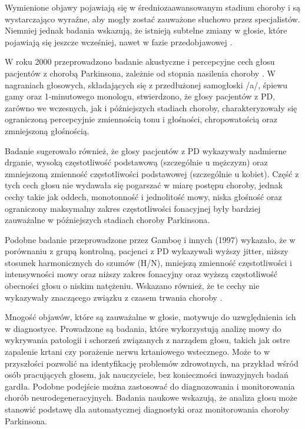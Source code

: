 Wymienione objawy pojawiają się w średniozaawansowanym stadium choroby i są wystarczająco wyraźne, aby mogły zostać zauważone słuchowo przez specjalistów.
Niemniej jednak badania wskazują, że istnieją subtelne zmiany w głosie, które pojawiają się jeszcze wcześniej, nawet w fazie przedobjawowej \cite{2023_PD_voice}.

W roku 2000 przeprowadzono badanie akustyczne i percepcyjne cech głosu pacjentów z chorobą Parkinsona, zależnie od stopnia nasilenia choroby \cite{https://doi.org/10.1080/136828200410654}.
W nagraniach głosowych, składających się z przedłużonej samogłoski /a/, śpiewu gamy oraz 1-minutowego monologu, stwierdzono, że głosy pacjentów z PD,
zarówno we wczesnych, jak i późniejszych stadiach choroby, charakteryzowały się ograniczoną percepcyjnie zmiennością tonu i głośności, chropowatością
oraz zmniejszoną głośnością.

Badanie sugerowało również, że głosy pacjentów z PD wykazywały nadmierne drganie, wysoką częstotliwość podstawową (szczególnie u mężczyzn) oraz zmniejszoną zmienność częstotliwości podstawowej (szczególnie u kobiet).
Część z tych cech głosu nie wydawała się pogarszać w miarę postępu choroby, jednak cechy takie jak oddech, monotonność i jednolitość mowy, niska głośność oraz ograniczony maksymalny zakres częstotliwości fonacyjnej były bardziej zauważalne w późniejszych stadiach choroby Parkinsona.

Podobne badanie przeprowadzone przez Gamboę i innych (1997) wykazało, że w porównaniu z grupą kontrolną, pacjenci z PD wykazywali wyższy jitter, niższy
stosunek harmonicznych do szumów (H/N), mniejszą zmienność częstotliwości i intensywności mowy oraz niższy zakres fonacyjny oraz wyższą częstotliwość
obecności głosu o niskim natężeniu.
Wskazano również, że te cechy nie wykazywały znaczącego związku z czasem trwania choroby \cite{GAMBOA1997314}.

Mnogość objawów, które są zauważalne w głosie, motywuje do uzwględnienia ich w diagnostyce.
Prowadzone są badania, które wykorzystują analizę mowy do wykrywania patologii i schorzeń związanych z narządem głosu, takich jak ostre zapalenie krtani czy porażenie nerwu krtaniowego wstecznego.
Może to w przyszłości pozwolić na identyfikację problemów zdrowotnych, na przykład wśród osób pracujących głosem, jak nauczyciele, bez konieczności inwazyjnych badań gardła.
Podobne podejście można zastosować do diagnozowania i monitorowania chorób neurodegeneracyjnych.
Badania naukowe wskazują, że analiza głosu może stanowić podstawę dla automatycznej diagnostyki oraz monitorowania choroby Parkinsona.

